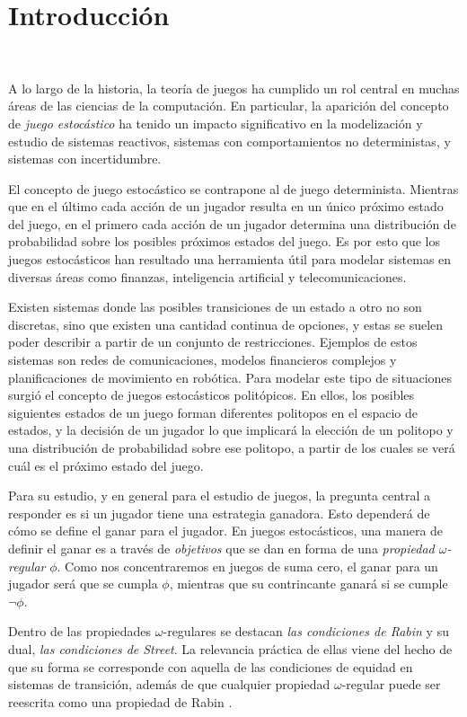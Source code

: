 \chapter{Introducción}
~\label{cap:intro}

A lo largo de la historia, la teoría de juegos ha cumplido un rol central en
muchas áreas de las ciencias de la computación. En particular, la aparición del
concepto de \textit{juego estocástico} ha tenido un impacto significativo en la
modelización y estudio de sistemas reactivos, sistemas con comportamientos no
deterministas, y sistemas con incertidumbre.

El concepto de juego estocástico se contrapone al de juego determinista.
Mientras que en el último cada acción de un jugador resulta en un único próximo
estado del juego, en el primero cada acción de un jugador determina una
distribución de probabilidad sobre los posibles próximos estados del juego. Es
por esto que los juegos estocásticos han resultado una herramienta útil para
modelar sistemas en diversas áreas como finanzas, inteligencia artificial y
telecomunicaciones.

Existen sistemas donde las posibles transiciones de un estado a otro no son
discretas, sino que existen una cantidad continua de opciones, y estas se
suelen poder describir a partir de un conjunto de restricciones. Ejemplos de
estos sistemas son redes de comunicaciones, modelos financieros complejos y
planificaciones de movimiento en robótica. Para modelar este tipo de
situaciones surgió el concepto de juegos estocásticos politópicos. En ellos,
los posibles siguientes estados de un juego forman diferentes politopos en el
espacio de estados, y la decisión de un jugador lo que implicará la elección de
un politopo y una distribución de probabilidad sobre ese politopo, a partir de
los cuales se verá cuál es el próximo estado del juego.

Para su estudio, y en general para el estudio de juegos, la pregunta central a
responder es si un jugador tiene una estrategia ganadora. Esto dependerá de
cómo se define el ganar para el jugador. En juegos estocásticos, una manera de
definir el ganar es a través de \textit{objetivos} que se dan en forma de una
\textit{propiedad $\omega$-regular} $\phi$. Como nos concentraremos en juegos
de suma cero, el ganar para un jugador será que se cumpla $\phi$, mientras que
su contrincante ganará si se cumple $\neg \phi$.

Dentro de las propiedades $\omega$-regulares se destacan \textit{las
	condiciones de Rabin} y su dual, \textit{las condiciones de Street}. La
relevancia práctica de ellas viene del hecho de que su forma se corresponde con
aquella de las condiciones de equidad en sistemas de transición, además de que
cualquier propiedad $\omega$-regular puede ser reescrita como una propiedad de
Rabin \cite{AutomataLogicsInfiniteGames}.

